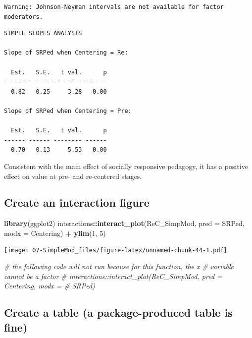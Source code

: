 \documentclass[
  11pt,
]{book}
\newenvironment{Shaded}{\begin{snugshade}}{\end{snugshade}}
\newcommand{\AttributeTok}[1]{\textcolor[rgb]{0.27,0.27,0.27}{#1}}
\newcommand{\CommentTok}[1]{\textcolor[rgb]{0.37,0.37,0.37}{\textit{#1}}}
\newcommand{\DecValTok}[1]{\textcolor[rgb]{0.06,0.06,0.06}{#1}}
\newcommand{\FunctionTok}[1]{\textcolor[rgb]{0.27,0.27,0.27}{\textbf{#1}}}
\newcommand{\NormalTok}[1]{#1}
\newcommand{\SpecialCharTok}[1]{\textcolor[rgb]{0.43,0.43,0.43}{\textbf{#1}}}
\begin{document}
\begin{verbatim}
Warning: Johnson-Neyman intervals are not available for factor moderators.
\end{verbatim}

\begin{verbatim}
SIMPLE SLOPES ANALYSIS 

Slope of SRPed when Centering = Re: 

  Est.   S.E.   t val.      p
------ ------ -------- ------
  0.82   0.25     3.28   0.00

Slope of SRPed when Centering = Pre: 

  Est.   S.E.   t val.      p
------ ------ -------- ------
  0.70   0.13     5.53   0.00
\end{verbatim}

Consistent with the main effect of socially responsive pedagogy, it has a positive effect on value at pre- and re-centered stages.

\hypertarget{create-an-interaction-figure}{%
\subsection*{Create an interaction figure}\label{create-an-interaction-figure}}


\begin{Shaded}
\begin{Highlighting}[]
\FunctionTok{library}\NormalTok{(ggplot2)}
\NormalTok{interactions}\SpecialCharTok{::}\FunctionTok{interact\_plot}\NormalTok{(ReC\_SimpMod, }\AttributeTok{pred =}\NormalTok{ SRPed, }\AttributeTok{modx =}\NormalTok{ Centering) }\SpecialCharTok{+}
    \FunctionTok{ylim}\NormalTok{(}\DecValTok{1}\NormalTok{, }\DecValTok{5}\NormalTok{)}
\end{Highlighting}
\end{Shaded}

\texttt{[image: 07-SimpleMod\_files/figure-latex/unnamed-chunk-44-1.pdf]}

\begin{Shaded}
\begin{Highlighting}[]
\CommentTok{\# the following code will not run because for this function, the x}
\CommentTok{\# variable cannot be a factor}
\CommentTok{\# interactions::interact\_plot(ReC\_SimpMod, pred = Centering, modx =}
\CommentTok{\# SRPed)}
\end{Highlighting}
\end{Shaded}

\hypertarget{create-a-table-a-package-produced-table-is-fine}{%
\subsection*{Create a table (a package-produced table is fine)}\label{create-a-table-a-package-produced-table-is-fine}}
\end{document}
